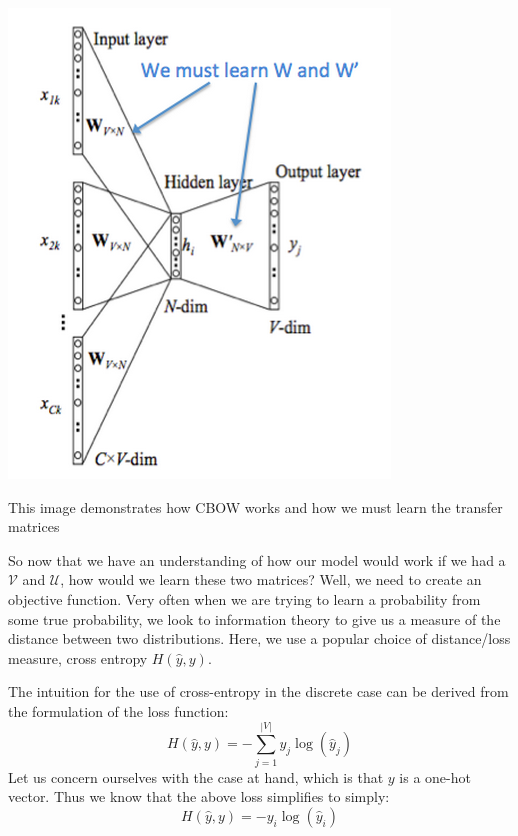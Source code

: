 \documentclass{tufte-handout}
\begin{document}
\begin{marginfigure}%
  \includegraphics[width=\linewidth]{CBOW}
  \caption{This image demonstrates how CBOW works and how we must learn the transfer matrices}
  \label{fig:CBOW}
\end{marginfigure}

So now that we have an understanding of how our model would work if we had a $\mathcal{V}$ and $\mathcal{U}$, how would we learn these two matrices? Well, we need to create an objective function. Very often when we are trying to learn a probability from some true probability, we look to information theory to give us a measure of the distance between two distributions. Here, we use a popular choice of distance/loss measure, cross entropy $H(\hat{y},y)$. 

The intuition for the use of cross-entropy in the discrete case can be derived from the formulation of the loss function:
$$H(\hat{y},y) = -\sum_{j = 1}^{|V|} y_j \log(\hat{y}_j)$$
Let us concern ourselves with the case at hand, which is that $y$ is a one-hot vector. Thus we know that the above loss simplifies to simply:
$$H(\hat{y},y) = -y_i \log(\hat{y}_i)$$
\end{document}
